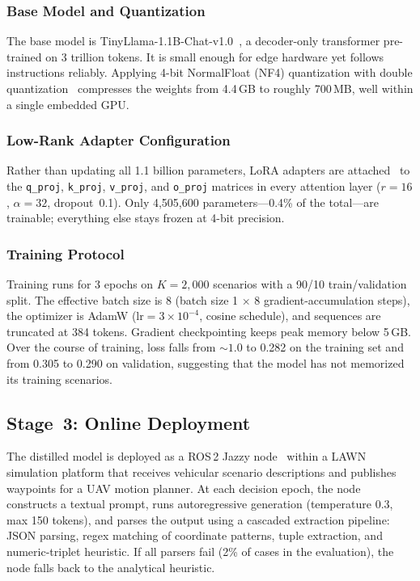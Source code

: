 \documentclass[journal]{IEEEtran}
\begin{document}
\subsubsection{Base Model and Quantization}

The base model is TinyLlama-1.1B-Chat-v1.0~\cite{zhang2024tinyllama}, a decoder-only transformer pre-trained on 3 trillion tokens. It is small enough for edge hardware yet follows instructions reliably. Applying 4-bit NormalFloat (NF4) quantization with double quantization~\cite{dettmers2023qlora} compresses the weights from 4.4\,GB to roughly 700\,MB, well within a single embedded GPU.

\subsubsection{Low-Rank Adapter Configuration}

Rather than updating all 1.1 billion parameters, LoRA adapters are attached~\cite{hu2022lora} to the \texttt{q\_proj}, \texttt{k\_proj}, \texttt{v\_proj}, and \texttt{o\_proj} matrices in every attention layer ($r{=}16$, $\alpha{=}32$, dropout~0.1). Only 4{,}505{,}600 parameters---0.4\% of the total---are trainable; everything else stays frozen at 4-bit precision.

\subsubsection{Training Protocol}

Training runs for 3 epochs on $K = 2{,}000$ scenarios with a 90/10 train/validation split. The effective batch size is 8 (batch size 1 $\times$ 8 gradient-accumulation steps), the optimizer is AdamW ($\text{lr} = 3{\times}10^{-4}$, cosine schedule), and sequences are truncated at 384 tokens. Gradient checkpointing keeps peak memory below 5\,GB. Over the course of training, loss falls from ${\sim}1.0$ to 0.282 on the training set and from 0.305 to 0.290 on validation, suggesting that the model has not memorized its training scenarios.

\subsection{Stage~3: Online Deployment}

The distilled model is deployed as a ROS\,2 Jazzy node~\cite{macenski2022ros2} within a LAWN simulation platform that receives vehicular scenario descriptions and publishes waypoints for a UAV motion planner. At each decision epoch, the node constructs a textual prompt, runs autoregressive generation (temperature 0.3, max 150 tokens), and parses the output using a cascaded extraction pipeline: JSON parsing, regex matching of coordinate patterns, tuple extraction, and numeric-triplet heuristic. If all parsers fail (2\% of cases in the evaluation), the node falls back to the analytical heuristic.
\end{document}
